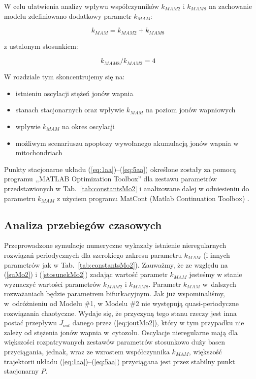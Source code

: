 W celu ułatwienia analizy wpływu współczynników $k_{MAM2}$ i $k_{MAM8}$ na zachowanie modelu zdefiniowano dodatkowy parametr $k_{MAM}$:

\begin{equation}\label{suMo2}
k_{MAM} = k_{MAM2} + k_{MAM8}
\end{equation}


\noindent z ustalonym stosunkiem:

\begin{equation}\label{stosunekMo2}
k_{MAM8}/k_{MAM2} = 4
\end{equation}


\noindent W rozdziale tym skoncentrujemy się na:

\begin{itemize}
    \item istnieniu oscylacji stężeń jonów wapnia
    \item stanach stacjonarnych oraz wpływie $k_{MAM}$ na poziom jonów wapniowych
    \item wpływie $k_{MAM}$ na okres oscylacji
    \item możliwym scenariuszu apoptozy wywołanego akumulacją jonów wapnia w mitochondriach
\end{itemize}

Punkty stacjonarne układu (\ref{eq:1aa})--(\ref{eq:5aa}) określone zostały za pomocą programu ,,MATLAB Optimization Toolbox'' dla zestawu parametrów przedstawionych w Tab.~\ref{tab:constantsMo2} i analizowane dalej w odniesieniu do parametru $k_{MAM}$ z użyciem programu MatCont (Matlab Continuation Toolbox) \cite{Dhooge2003}.

\FloatBarrier
\subsection{Analiza przebiegów czasowych}

Przeprowadzone symulacje numeryczne wykazały istnienie   nieregularnych rozwiązań periodycznych dla szerokiego zakresu parametru $k_{MAM}$ (i innych parametrów jak w Tab.~\ref{tab:constantsMo2}). Zauważmy, że ze względu na (\ref{suMo2}) i (\ref{stosunekMo2}) zadając wartość parametr $k_{MAM}$ jesteśmy w stanie wyznaczyć wartości parametrów $k_{MAM2}$ i $k_{MAM8}$. Parametr $k_{MAM}$ w~dalszych rozważaniach będzie parametrem bifurkacyjnym. Jak już wspominaliśmy, w~odróżnieniu od Modelu \#1, w Modelu \#2 nie występują quasi-periodyczne rozwiązania chaotyczne. Wydaje się, że przyczyną tego stanu rzeczy jest inna postać przepływu $J_{out}$ danego przez (\ref{eq:joutMo2}), który w tym przypadku nie zależy od stężenia jonów wapnia w~cytozolu. Oscylacje nieregularne mają dla większości rozpatrywanych zestawów parametrów stosunkowo duży basen przyciągania, jednak, wraz ze wzrostem współczynnika $k_{MAM}$, większość trajektorii układu (\ref{eq:1aa})--(\ref{eq:5aa}) przyciągana jest przez stabilny punkt stacjonarny $P$.

